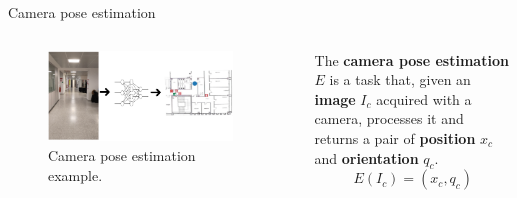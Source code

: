 \documentclass[
    center,
]{beamer}
\begin{document}
\begin{frame}{Camera pose estimation}
    \begin{columns}
        \begin{figure}
            \centering
            \includegraphics[width=0.9\textwidth]{../imgs/introduction_example.png}
            \caption{Camera pose estimation example.}
        \end{figure}

        The \textbf{camera pose estimation} $E$ is a task that, given an \textbf{image} $I_c$ acquired with a camera, processes it and returns a pair of \textbf{position} $x_c$ and \textbf{orientation} $q_c$.
    \[
        E(I_c) = (x_c, q_c)
    \]
    \end{columns}
\end{frame}
\end{document}
